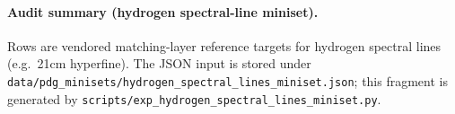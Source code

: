 \paragraph{Audit summary (hydrogen spectral-line miniset).} \AuditTag Rows are vendored matching-layer reference targets for hydrogen spectral lines (e.g.\ 21cm hyperfine). The JSON input is stored under \texttt{data/pdg\_minisets/hydrogen\_spectral\_lines\_miniset.json}; this fragment is generated by \texttt{scripts/exp\_hydrogen\_spectral\_lines\_miniset.py}.